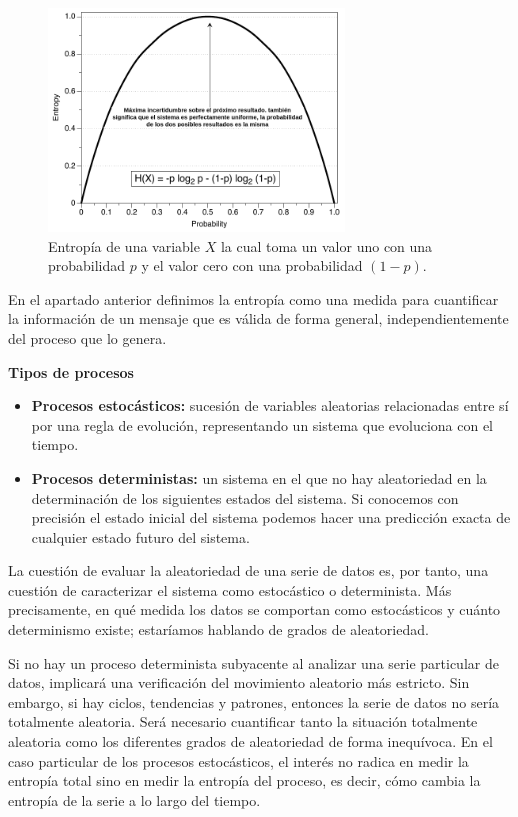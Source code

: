 \documentclass[a4paper,12pt]{article}
\begin{document}
\begin{figure}[H]
	\begin{center}
		\includegraphics[width=0.7\textwidth]{entropy2.png}
		\caption{Entropía de una variable $X$ la cual toma un valor uno con una probabilidad $p$ y el valor cero con una probabilidad $(1-p)$. \citep{delgado2019approximate}}
		\label{fig:entropy}
	\end{center}
\end{figure}

En el apartado anterior definimos la entropía como una medida para cuantificar la información de un mensaje que es válida de forma general, independientemente del proceso que lo genera.

\hfill

\textbf{Tipos de procesos}
\begin{itemize}[noitemsep, topsep=2pt]
	\item \textbf{Procesos estocásticos:} sucesión de variables aleatorias relacionadas entre sí por una regla de evolución, representando un sistema que evoluciona con el tiempo. 
	\item \textbf{Procesos deterministas:} un sistema en el que no hay aleatoriedad en la determinación de los siguientes estados del sistema. Si conocemos con precisión el estado inicial del sistema podemos hacer una predicción exacta de cualquier estado futuro del sistema.
\end{itemize}

La cuestión de evaluar la aleatoriedad de una serie de datos es, por tanto, una cuestión de caracterizar el sistema como estocástico o determinista. Más precisamente, en qué medida los datos se comportan como estocásticos y cuánto determinismo existe; estaríamos hablando de grados de aleatoriedad. 

\clearpage

Si no hay un proceso determinista subyacente al analizar una serie particular de datos, implicará una verificación del movimiento aleatorio más estricto. Sin embargo, si hay ciclos, tendencias y patrones, entonces la serie de datos no sería totalmente aleatoria. Será necesario cuantificar tanto la situación totalmente aleatoria como los diferentes grados de aleatoriedad de forma inequívoca. En el caso particular de los procesos estocásticos, el interés no radica en medir la entropía total sino en medir la entropía del proceso, es decir, cómo cambia la entropía de la serie a lo largo del tiempo. 
\end{document}
